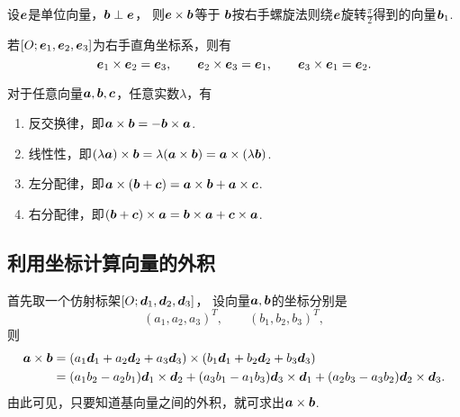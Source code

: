 \begin{theorem}
设\(\boldsymbol{e}\)是单位向量，\(\boldsymbol{b}\perp\boldsymbol{e}\)，
则\(\boldsymbol{e}\times\boldsymbol{b}\)等于
\(\boldsymbol{b}\)按右手螺旋法则绕\(\boldsymbol{e}\)旋转\(\frac{\pi}{2}\)得到的向量\(\boldsymbol{b}_1\).
\end{theorem}

\begin{corollary}
若\([O;\boldsymbol{e}_1,\boldsymbol{e}_2,\boldsymbol{e}_3]\)为右手直角坐标系，则有\[
	\boldsymbol{e}_1 \times \boldsymbol{e}_2 = \boldsymbol{e}_3, \qquad
	\boldsymbol{e}_2 \times \boldsymbol{e}_3 = \boldsymbol{e}_1, \qquad
	\boldsymbol{e}_3 \times \boldsymbol{e}_1 = \boldsymbol{e}_2.
\]
\end{corollary}

\begin{theorem}
对于任意向量\(\boldsymbol{a},\boldsymbol{b},\boldsymbol{c}\)，任意实数\(\lambda\)，有
\begin{enumerate}
	\item 反交换律，即\(\boldsymbol{a}\times\boldsymbol{b}=-\boldsymbol{b}\times\boldsymbol{a}\).
	\item 线性性，即\((\lambda \boldsymbol{a})\times\boldsymbol{b}
	= \lambda(\boldsymbol{a}\times\boldsymbol{b})
	= \boldsymbol{a}\times(\lambda \boldsymbol{b})\).
	\item 左分配律，即\(\boldsymbol{a}\times(\boldsymbol{b}+\boldsymbol{c})
	= \boldsymbol{a}\times\boldsymbol{b} + \boldsymbol{a}\times\boldsymbol{c}\).
	\item 右分配律，即\((\boldsymbol{b}+\boldsymbol{c})\times\boldsymbol{a}
	= \boldsymbol{b}\times\boldsymbol{a} + \boldsymbol{c}\times\boldsymbol{a}\).
\end{enumerate}
\end{theorem}

\subsection{利用坐标计算向量的外积}
首先取一个仿射标架\([O;\boldsymbol{d}_1,\boldsymbol{d}_2,\boldsymbol{d}_3]\)，
设向量\(\boldsymbol{a},\boldsymbol{b}\)的坐标分别是\[
	(a_1,a_2,a_3)^T, \qquad
	(b_1,b_2,b_3)^T,
\]
则\begin{equation}
\begin{split}
	\boldsymbol{a}\times\boldsymbol{b}
	&= (a_1 \boldsymbol{d}_1 + a_2 \boldsymbol{d}_2 + a_3 \boldsymbol{d}_3)
	\times (b_1 \boldsymbol{d}_1 + b_2 \boldsymbol{d}_2 + b_3 \boldsymbol{d}_3) \\
	&= (a_1 b_2 - a_2 b_1) \boldsymbol{d}_1 \times \boldsymbol{d}_2
	+ (a_3 b_1 - a_1 b_3) \boldsymbol{d}_3 \times \boldsymbol{d}_1
	+ (a_2 b_3 - a_3 b_2) \boldsymbol{d}_2 \times \boldsymbol{d}_3.
\end{split}
\end{equation}
由此可见，只要知道基向量之间的外积，就可求出\(\boldsymbol{a}\times\boldsymbol{b}\).

